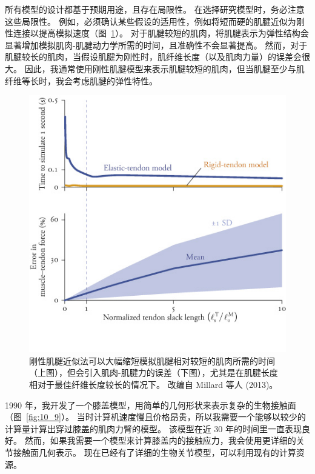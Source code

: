 所有模型的设计都基于预期用途，且存在局限性。
在选择研究模型时，务必注意这些局限性。
例如，必须确认某些假设的适用性，例如将短而硬的肌腱近似为刚性连接以提高模拟速度（图~\ref{fig:10_8}）。
对于肌腱较短的肌肉，将肌腱表示为弹性结构会显著增加模拟肌肉-肌腱动力学所需的时间，且准确性不会显著提高。
然而，对于肌腱较长的肌肉，当假设肌腱为刚性时，肌纤维长度（以及肌肉力量）的误差会很大。
因此，我通常使用刚性肌腱模型来表示肌腱较短的肌肉，但当肌腱至少与肌纤维等长时，我会考虑肌腱的弹性特性。

\begin{figure}[!htb]
	\centering
	\includegraphics[width=0.8\linewidth]{chap10/10_8}
	\caption{刚性肌腱近似法可以大幅缩短模拟肌腱相对较短的肌肉所需的时间（上图），但会引入肌肉-肌腱力的误差（下图），尤其是在肌腱长度相对于最佳纤维长度较长的情况下。
		改编自 Millard 等人 (2013)。 \label{fig:10_8}}
\end{figure}

1990 年，我开发了一个膝盖模型，用简单的几何形状来表示复杂的生物接触面（图~\ref{fig:10_9}）。
当时计算机速度慢且价格昂贵，所以我需要一个能够以较少的计算量计算出穿过膝盖的肌肉力臂的模型。
该模型在近 30 年的时间里一直表现良好。
然而，如果我需要一个模型来计算膝盖内的接触应力，我会使用更详细的关节接触面几何表示。
现在已经有了详细的生物关节模型，可以利用现有的计算资源。


